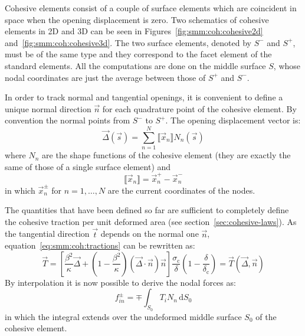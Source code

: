 Cohesive elements consist of a couple of surface elements which are
coincident in space when the opening displacement is zero. Two
schematics of cohesive elements in 2D and 3D can be seen in
Figures~\ref{fig:smm:coh:cohesive2d}
and~\ref{fig:smm:coh:cohesive3d}. The two surface elements, denoted by
$S^-$ and $S^+$, must be of the same type and they correspond to the
facet element of the standard elements. All the computations are done
on the middle surface $S$, whose nodal coordinates are just the
average between those of $S^+$ and $S^-$.

In order to track normal and tangential openings, it is convenient to
define a unique normal direction $\vec{n}$ for each quadrature point
of the cohesive element. By convention the normal points from $S^-$ to
$S^+$. The opening displacement vector is:
\begin{equation}
  \label{eq:opening_displacement}
  \vec{\Delta} (\vec{s}) = \sum_{n=1}^N \llbracket \vec{x}_n \rrbracket N_n (\vec s)
\end{equation}
where $N_n$ are the shape functions of the cohesive element (they are
exactly the same of those of a single surface element) and
\begin{equation}
  \label{eq:disp_difference}
  \llbracket \vec{x}_n \rrbracket = \vec{x}_n^+ - \vec{x}_n^-
\end{equation}
in which $\vec{x}_n^\pm$ for $n=1,\dots,N$ are the current coordinates
of the nodes.

The quantities that have been defined so far are sufficient to
completely define the cohesive traction per unit deformed area (see
section~\ref{sec:cohesive-laws}). As the tangential direction
$\vec{t}$ depends on the normal one $\vec{n}$,
equation~\eqref{eq:smm:coh:tractions} can be rewritten as:
\begin{equation}
  \vec{T} = \left[ \frac{\beta^2}{\kappa} \vec{\Delta} +
    \left( 1- \frac{\beta^2}{\kappa}\right)
    \left( \vec{\Delta} \cdot \vec{n}\right) \vec{n} \right]
  \frac{\sigma_\mathrm{c}}{\delta}
  \left( 1- \frac{\delta}{\delta_\mathrm{c}} \right) =
  \vec{T}(\vec{\Delta}, \vec{n})
\end{equation}
 By interpolation it is now possible to derive the nodal
forces as:
\begin{equation}
  f_{in}^\pm = \mp \int_{S_0} T_i N_n\, \mathrm{d}S_0
\end{equation}
in which the integral extends over the undeformed middle surface $S_0$
of the cohesive element.

